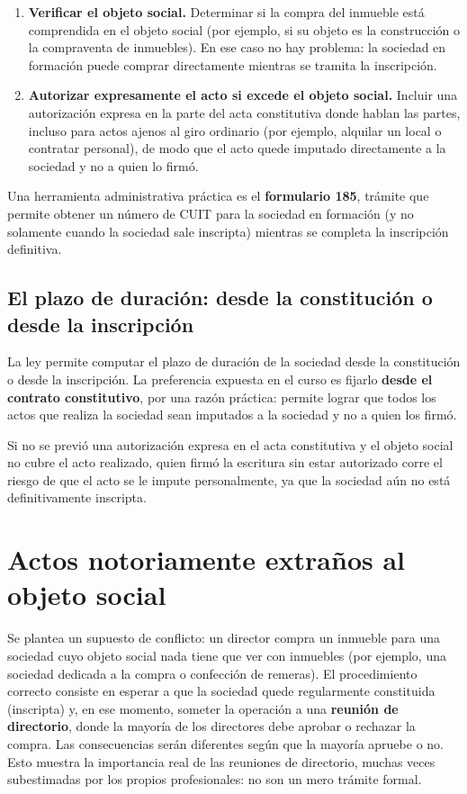 \documentclass[12pt,oneside]{book}
\begin{document}
\begin{enumerate}
    \item \textbf{Verificar el objeto social.} Determinar si la compra del inmueble está comprendida en el objeto social (por ejemplo, si su objeto es la construcción o la compraventa de inmuebles). En ese caso no hay problema: la sociedad en formación puede comprar directamente mientras se tramita la inscripción.
    \item \textbf{Autorizar expresamente el acto si excede el objeto social.} Incluir una autorización expresa en la parte del acta constitutiva donde hablan las partes, incluso para actos ajenos al giro ordinario (por ejemplo, alquilar un local o contratar personal), de modo que el acto quede imputado directamente a la sociedad y no a quien lo firmó.
\end{enumerate}

Una herramienta administrativa práctica es el \textbf{formulario 185}, trámite que permite obtener un número de CUIT para la sociedad en formación (y no solamente cuando la sociedad sale inscripta) mientras se completa la inscripción definitiva.

\subsection{El plazo de duración: desde la constitución o desde la inscripción}

La ley permite computar el plazo de duración de la sociedad desde la constitución o desde la inscripción. La preferencia expuesta en el curso es fijarlo \textbf{desde el contrato constitutivo}, por una razón práctica: permite lograr que todos los actos que realiza la sociedad sean imputados a la sociedad y no a quien los firmó.

\begin{important}
Si no se previó una autorización expresa en el acta constitutiva y el objeto social no cubre el acto realizado, quien firmó la escritura sin estar autorizado corre el riesgo de que el acto se le impute personalmente, ya que la sociedad aún no está definitivamente inscripta.
\end{important}

\section{Actos notoriamente extraños al objeto social}
\label{sec:extranos}

Se plantea un supuesto de conflicto: un director compra un inmueble para una sociedad cuyo objeto social nada tiene que ver con inmuebles (por ejemplo, una sociedad dedicada a la compra o confección de remeras). El procedimiento correcto consiste en esperar a que la sociedad quede regularmente constituida (inscripta) y, en ese momento, someter la operación a una \textbf{reunión de directorio}, donde la mayoría de los directores debe aprobar o rechazar la compra. Las consecuencias serán diferentes según que la mayoría apruebe o no. Esto muestra la importancia real de las reuniones de directorio, muchas veces subestimadas por los propios profesionales: no son un mero trámite formal.
\end{document}
